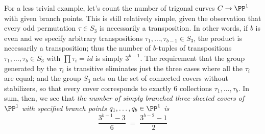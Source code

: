 For a less trivial example, let's count the number of trigonal curves $C \to \PP^1$ with given branch points. This is still relatively simple, given the observation that every odd permutation $\tau \in S_3$ is necessarily a transposition. In other words, if $b$ is even and we specify arbitrary transpositions $\tau_1,\dots,\tau_{b-1} \in S_3$, the product is necessarily a transposition; thus the number of $b$-tuples of transpositions $\tau_1,\dots,\tau_{b} \in S_3$ with $\prod \tau_i = id$ is simply $3^{b-1}$. The requirement that the group generated by the $\tau_i$ is transitive eliminates just the three cases where all the $\tau_i$ are equal; and the group $S_3$ acts on the set of connected covers without stabilizers, so that every cover corresponds to exactly 6 collections $\tau_1,\dots,\tau_b$. In sum, then, we see that \emph{the number of simply branched three-sheeted covers of $\PP^1$ with specified branch points $q_1,\dots,q_b \in \PP^1$ is}
$$
\frac{3^{b-1} - 3}{6} \; = \; \frac{3^{b-2} - 1}{2} 
$$


%
%
%
%
%

